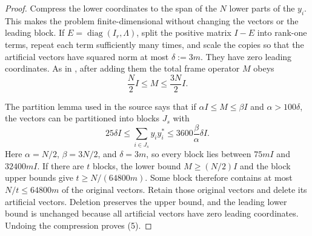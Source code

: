 \documentclass[10pt]{article}
\newcommand{\diag}{\operatorname{diag}}
\begin{document}
\begin{proof}
Compress the lower coordinates to the span of the $N$ lower parts of the
$y_i$.  This makes the problem finite-dimensional without changing the
vectors or the leading block.  If
$E=\diag(I_r,\Lambda)$, split the positive matrix $I-E$ into rank-one
terms, repeat each term sufficiently many times, and scale the copies so that
the artificial vectors have squared norm at most $\delta:=3m$.  They have
zero leading coordinates.  As in \cite[Section~4]{DKU}, after adding them the
total frame operator $M$ obeys
\[
 \frac N2I\leq M\leq\frac{3N}{2}I.
\]

The partition lemma used in the source says that if
$\alpha I\leq M\leq\beta I$ and
$\alpha>100\delta$, the vectors can be partitioned into blocks $J_s$ with
\[
 25\delta I\leq\sum_{i\in J_s}y_i y_i^*
 \leq3600\frac\beta\alpha\delta I.
\]
Here $\alpha=N/2$, $\beta=3N/2$, and $\delta=3m$, so every block lies
between $75mI$ and $32400mI$.  If there are $t$ blocks, the lower bound
$M\geq(N/2)I$ and the block upper bounds give
$t\geq N/(64800m)$.  Some block therefore contains at most
$N/t\leq64800m$ of the original vectors.  Retain those original vectors and
delete its artificial vectors.  Deletion preserves the upper bound, and the
leading lower bound is unchanged because all artificial vectors have zero
leading coordinates.  Undoing the compression proves (5).
\end{proof}
\end{document}
